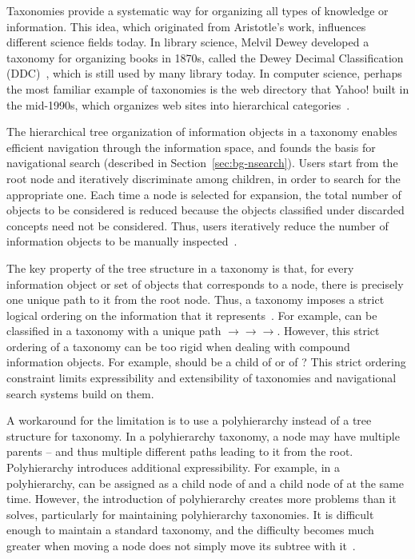 Taxonomies provide a systematic way for organizing all types of knowledge or information. This idea, which originated from Aristotle's work, influences different science fields today. In library science, Melvil Dewey developed a taxonomy for organizing books in 1870s, called the Dewey Decimal Classification (DDC)~\cite{dewey1876classification}, which is still used by many library today. In computer science, perhaps the most familiar example of taxonomies is the web directory that Yahoo! built in the mid-1990s, which organizes web sites into hierarchical categories~\cite{van2008history}.

The hierarchical tree organization of information objects in a taxonomy enables efficient navigation through the information space, and founds the basis for navigational search (described in Section~\ref{sec:bg-nsearch}). Users start from the root node and iteratively discriminate among children, in order to search for the appropriate one. Each time a node is selected for expansion, the total number of objects to be considered is reduced because the objects classified under discarded concepts need not be considered. Thus, users iteratively reduce the number of information objects to be manually inspected~\cite{sacco2009dynamic}.

The key property of the tree structure in a taxonomy is that, for every information object or set of objects that corresponds to a node, there is precisely one unique path to it from the root node. Thus, a taxonomy imposes a strict logical ordering on the information that it represents~\cite{tunkelang2009faceted}. For example,  can be classified in a taxonomy with a unique path  $\rightarrow$$\rightarrow$$\rightarrow$. However, this strict ordering of a taxonomy can be too rigid when dealing with compound information objects. For example, should  be a child of  or of ? This strict ordering constraint limits expressibility and extensibility of taxonomies and navigational search systems build on them.

A workaround for the limitation is to use a polyhierarchy instead of a tree structure for taxonomy. In a polyhierarchy taxonomy, a node may have multiple parents -- and thus multiple different paths leading to it from the root. Polyhierarchy introduces additional expressibility. For example, in a polyhierarchy,  can be assigned as a child node of  and a child node of  at the same time. However, the introduction of polyhierarchy creates more problems than it solves, particularly for maintaining polyhierarchy taxonomies. It is difficult enough to maintain a standard taxonomy, and the difficulty becomes much greater when moving a node does not simply move its subtree with it~\cite{tunkelang2009faceted}.

